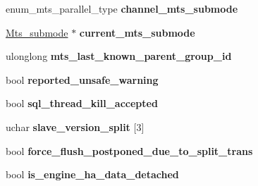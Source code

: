 \begin{DoxyCompactItemize}
enum\+\_\+mts\+\_\+parallel\+\_\+type {\bfseries channel\+\_\+mts\+\_\+submode}
\item 
\mbox{\label{classRelay__log__info_a8fd8c969c11e538879d1012aa2012b25}} 
\mbox{\hyperlink{classMts__submode}{Mts\+\_\+submode}} $\ast$ {\bfseries current\+\_\+mts\+\_\+submode}
\item 
\mbox{\label{classRelay__log__info_afe1366c1bc5aa93d8d69dc18d1df3814}} 
ulonglong {\bfseries mts\+\_\+last\+\_\+known\+\_\+parent\+\_\+group\+\_\+id}
\item 
\mbox{\label{classRelay__log__info_a4a7324db04d581524aabb99168198309}} 
bool {\bfseries reported\+\_\+unsafe\+\_\+warning}
\item 
\mbox{\label{classRelay__log__info_abfe3e935ab8e2acd38fb8fd9e6c93b55}} 
bool {\bfseries sql\+\_\+thread\+\_\+kill\+\_\+accepted}
\item 
\mbox{\label{classRelay__log__info_a2fedc08f5818062672b5856cfef3503b}} 
uchar {\bfseries slave\+\_\+version\+\_\+split} \mbox{[}3\mbox{]}
\item 
\mbox{\label{classRelay__log__info_a5ac60dc20a9772ae2c3d448ece59895f}} 
bool {\bfseries force\+\_\+flush\+\_\+postponed\+\_\+due\+\_\+to\+\_\+split\+\_\+trans}
\item 
\mbox{\label{classRelay__log__info_a7aac59026b294e104954ce20641f0436}} 
bool {\bfseries is\+\_\+engine\+\_\+ha\+\_\+data\+\_\+detached}
\end{DoxyCompactItemize}

